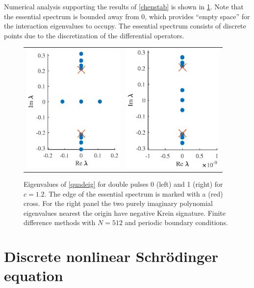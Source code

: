 \documentclass[thesis.tex]{subfiles}
\begin{document}
Numerical analysis supporting the results of \cref{chenstab} is shown in \cref{fig:quadeigdouble}. Note that the essential spectrum is bounded away from 0, which provides ``empty space'' for the interaction eigenvalues to occupy. The essential spectrum consists of discrete points due to the discretization of the differential operators.
\begin{figure}
\centering
\begin{tabular}{cc}
\includegraphics[width=5cm]{images/other/spec12_double1}&
\includegraphics[width=5cm]{images/other/spec12_double2}
\end{tabular} 
\caption[Eigenvalues for double pulses in Chen-McKenna]{Eigenvalues of \cref{quadeig} for double pulses 0 (left) and 1 (right) for $c=1.2$. The edge of the essential spectrum is marked with a (red) cross. For the right panel the two purely imaginary polynomial eigenvalues nearest the origin have negative Krein signature. Finite difference methods with $N = 512$ and periodic boundary conditions.}
\label{fig:quadeigdouble}
\end{figure}



\section{Discrete nonlinear Schr{\"o}dinger equation}\label{sec:DNLS}
\end{document}
